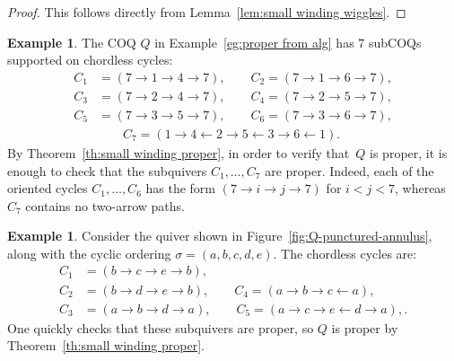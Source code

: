 \documentclass[11pt, letterpaper]{amsart}
\theoremstyle{definition}
\newtheorem{example}[theorem]{Example}
\numberwithin{equation}{section}
\def\wind{{\operatorname{wind}}}
\begin{document}
\begin{proof}
This follows directly from Lemma~\ref{lem:small winding wiggles}. 
%
%
\end{proof}

\begin{example}
\label{eg:E6-1-cycles}
The COQ $Q$ in Example~\ref{eg:proper from alg} has $7$ subCOQs supported on chordless cycles: 
\begin{align*}
C_1 &= (7 \rightarrow 1 \rightarrow 4 \rightarrow 7), \qquad
C_2 = (7 \rightarrow 1 \rightarrow 6 \rightarrow 7), \\
C_3 &= (7 \rightarrow 2 \rightarrow 4 \rightarrow 7), \qquad 
C_4 = (7 \rightarrow 2 \rightarrow 5 \rightarrow 7), \\
C_5 &= (7 \rightarrow 3 \rightarrow 5 \rightarrow 7), \qquad 
C_6 = (7 \rightarrow 3 \rightarrow 6 \rightarrow 7), \\
& \qquad C_7 =(1 \rightarrow 4 \leftarrow 2 \rightarrow 5 \leftarrow 3 \rightarrow 6 \leftarrow 1).
\end{align*}
By Theorem~\ref{th:small winding proper}, in order to verify that~$Q$ is proper,
it is enough to check that the subquivers $C_1,\dots,C_7$ are proper. 
Indeed,  each of the oriented cycles $C_1,\dots,C_6$ has the form $(7\rightarrow i \rightarrow j\rightarrow 7)$
for $i<j<7$, whereas $C_7$ contains no two-arrow paths. 
\end{example}

\begin{example}
\label{eg:proper from inherited}
Consider the quiver shown in Figure~\ref{fig:Q-punctured-annulus}, 
along with the cyclic ordering $\sigma=(a, b, c, d,e)$.
The chordless cycles are: 
\begin{align*}
C_1 &= (b \rightarrow c \rightarrow e \rightarrow  b), \\
C_2 &= (b \rightarrow d \rightarrow e \rightarrow b), \qquad C_4 = (a\rightarrow b \rightarrow c \leftarrow a), \\
C_3 &= (a \rightarrow b \rightarrow d \rightarrow a), \qquad\! C_5 = (a \rightarrow c \rightarrow e \leftarrow d \rightarrow a),. 
\end{align*}
One quickly checks that these subquivers are proper, so $Q$ is proper by Theorem~\ref{th:small winding proper}. 
\end{example}
\end{document}
